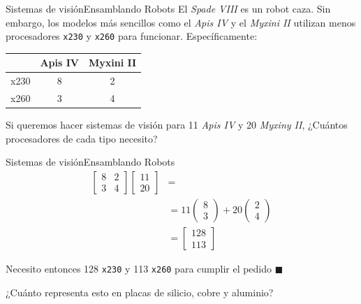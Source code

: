 \documentclass[spanish, c]{beamer}
\begin{document}
\begin{frame}{Sistemas de visión}{Ensamblando Robots}
    El \textit{Spade VIII} es un robot caza.
    Sin embargo, los modelos más sencillos como el \textit{Apis IV} y el \textit{Myxini II} utilizan menos procesadores \texttt{x230} y \texttt{x260} para funcionar. Específicamente:

    \begin{center}
        \begin{center}
            \begin{table}[H]
                \begin{tabular}{@{}ccc@{}}
                \toprule
                                        & Apis IV & Myxini II \\ \midrule
                \multicolumn{1}{c|}{x230} & 8    & 2    \\
                \multicolumn{1}{c|}{x260} & 3    & 4    \\ \bottomrule
                \end{tabular}
            \end{table}
        \end{center} 
    \end{center}

    Si queremos hacer sistemas de visión para 11 \textit{Apis IV} y 20 \textit{Myxiny II}, ¿Cuántos procesadores de cada tipo necesito?
\end{frame}

\begin{frame}{Sistemas de visión}{Ensamblando Robots}
    \begin{align*}
        \begin{bmatrix}
            8 & 2 \\ 3 & 4
        \end{bmatrix}
        \begin{bmatrix} 11 \\ 20\end{bmatrix} & = \\[2ex]
        & = 11 \begin{pmatrix} 8 \\ 3\end{pmatrix} + 20 \begin{pmatrix} 2 \\ 4\end{pmatrix} \\[2ex]
        & = \begin{bmatrix} 128 \\ 113 \end{bmatrix}
    \end{align*}

    Necesito entonces 128 \texttt{x230} y 113 \texttt{x260} para cumplir el pedido $\blacksquare$
    
    \bigskip

    ¿Cuánto representa esto en placas de silicio, cobre y aluminio?
\end{frame}
\end{document}
